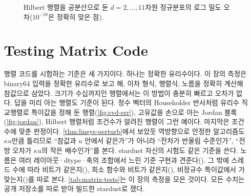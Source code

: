 \begin{figure}[htbp]
\centering
{}
\caption{Hilbert 행렬을 공분산으로 둔 $d=2,\dots,11$차원 정규분포의 로그 밀도 오차($10^{-18}$은 정확히 맞은 점).}
\label{fig:mvn}
\end{figure}

\section{Testing Matrix Code}
\label{sec:matrix-testing}

행렬 코드를 시험하는 기준은 세 가지이다. 하나는 정확한 유리수이다. 이 장의 측정은 binary64 입력을 정확한 유리수로 보고 해, 이차 형식, 행렬식, 노름을 정확히 계산해 참값으로 삼았다. 크기가 수십까지인 행렬에서는 이 방법이 충분히 빠르고 오차가 없다. 답을 미리 아는 행렬도 기준이 된다. 정수 벡터의 Householder 반사처럼 유리수 직교행렬로 특이값을 정해 둔 행렬(\cref{fig:svd-err}), 고유값을 손으로 아는 Jordan 블록(\cref{fig:jordan}), Hilbert 행렬처럼 조건수가 알려진 행렬이 그런 예이다. 마지막은 조건수에 맞춘 판정이다. \cref{thm:linsys-perturb}에서 보았듯 역방향으로 안정한 알고리즘도 $\kappa u$만큼 틀리므로 ``참값과 $u$ 안에서 같은가''가 아니라 ``잔차가 반올림 수준인가'', ``전방 오차가 $\kappa u$의 작은 배수인가''를 본다. stardust 자신의 시험도 같은 기준을 쓴다. 노름은 여러 레이아웃·dtype·축의 조합에서 느린 기준 구현과 견준다(). 그 밖에 스레드 수에 따라 비트가 같은지(), 희소 함수와 비트가 같은지(), 비정규수 특이값에서 가 맞는지()를 따로 본다. \cref{tab:matrix-tests}는 이 장의 측정을 모은 것이다. 모든 수치는 공개 저장소를 따로 받아 빌드한 stardust로 쟀다.

